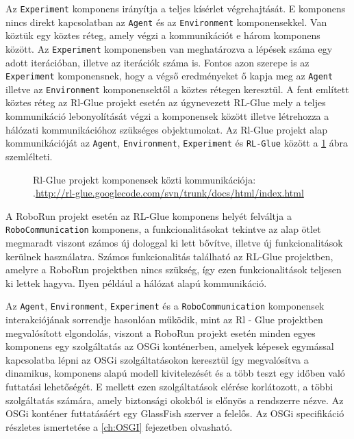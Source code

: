 	Az \texttt{Experiment} komponens irányítja a teljes kísérlet végrehajtását. E komponens nincs direkt kapcsolatban az \texttt{Agent} és az \texttt{Environment} komponensekkel. Van köztük egy köztes réteg, amely végzi a kommunikációt e három komponens között.  Az \texttt{Experiment} komponensben van meghatározva a lépések száma egy adott iterációban, illetve az iterációk száma is. Fontos azon szerepe is az \texttt{Experiment} komponensnek, hogy a végső eredményeket ő kapja meg az \texttt{Agent} illetve az \texttt{Environment} komponensektől a köztes rétegen keresztül.
A fent említett köztes réteg az Rl-Glue projekt esetén az úgynevezett RL-Glue mely a teljes kommunikáció lebonyolítását végzi a komponensek között illetve létrehozza a hálózati kommunikációhoz szükséges objektumokat. Az Rl-Glue projekt alap kommunikációját az \texttt{Agent}, \texttt{Environment}, \texttt{Experiment} és \texttt{RL-Glue} között a \ref{fig:RlGlueKommunikacio} ábra szemlélteti.

\begin{figure}[h!]
  \centering
  \caption[Példa képek beszúrására]%
  {Rl-Glue projekt komponensek közti kommunikációja:\\
  {\white .}\hfill\url{http://rl-glue.googlecode.com/svn/trunk/docs/html/index.html}}
  \label{fig:RlGlueKommunikacio}
\end{figure}

A RoboRun projekt esetén az RL-Glue komponens helyét felváltja a \texttt{RoboCommunication} komponens, a funkcionalitásokat tekintve az alap ötlet megmaradt viszont számos új dologgal ki lett bővítve, illetve új funkcionalitások kerülnek használatra. Számos funkcionalitás található az RL-Glue projektben, amelyre a RoboRun projektben nincs szükség, így ezen funkcionalitások teljesen ki lettek hagyva. Ilyen például a hálózat alapú kommunikáció.

	Az \texttt{Agent}, \texttt{Environment}, \texttt{Experiment} és a \texttt{RoboCommunication}  komponensek interakciójának sorrendje hasonlóan működik, mint az Rl - Glue projektben megvalósított elgondolás, viszont a RoboRun projekt esetén minden egyes komponens  egy szolgáltatás az OSGi konténerben, amelyek képesek egymással kapcsolatba lépni az OSGi szolgáltatásokon keresztül így megvalósítva a dinamikus, komponens alapú modell kivitelezését és a több teszt egy időben való futtatási lehetőségét. E mellett ezen szolgáltatások elérése korlátozott, a többi szolgáltatás számára, amely biztonsági okokból is előnyös a rendszerre nézve. Az OSGi konténer futtatásáért egy GlassFish\citep{glassfish} szerver a felelős. Az OSGi specifikáció részletes ismertetése a \ref{ch:OSGI} fejezetben olvasható.
	
